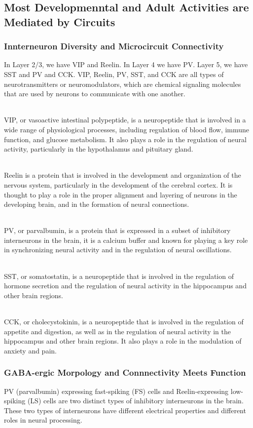 \begin{itemize}
\begin{itemize}
\section{Most Developmenntal and Adult Activities are Mediated by Circuits}
\subsubsection{Innterneuron Diversity and Microcircuit Connectivity}
In Layer 2/3, we have VIP and Reelin. In Layer 4 we have PV. Layer 5, we have SST and PV and CCK.
VIP, Reelin, PV, SST, and CCK are all types of neurotransmitters or neuromodulators, which are chemical signaling molecules that are used by neurons to communicate with one another.

\\VIP, or vasoactive intestinal polypeptide, is a neuropeptide that is involved in a wide range of physiological processes, including regulation of blood flow, immune function, and glucose metabolism. It also plays a role in the regulation of neural activity, particularly in the hypothalamus and pituitary gland.

\\Reelin is a protein that is involved in the development and organization of the nervous system, particularly in the development of the cerebral cortex. It is thought to play a role in the proper alignment and layering of neurons in the developing brain, and in the formation of neural connections.

\\PV, or parvalbumin, is a protein that is expressed in a subset of inhibitory interneurons in the brain, it is a calcium buffer and known for playing a key role in synchronizing neural activity and in the regulation of neural oscillations.

\\SST, or somatostatin, is a neuropeptide that is involved in the regulation of hormone secretion and the regulation of neural activity in the hippocampus and other brain regions.

\\CCK, or cholecystokinin, is a neuropeptide that is involved in the regulation of appetite and digestion, as well as in the regulation of neural activity in the hippocampus and other brain regions. It also plays a role in the modulation of anxiety and pain.




\subsubsection{GABA-ergic Morpology and Connnectivity Meets Function}
PV (parvalbumin) expressing fast-spiking (FS) cells and Reelin-expressing low-spiking (LS) cells are two distinct types of inhibitory interneurons in the brain. These two types of interneurons have different electrical properties and different roles in neural processing.


\end{itemize}
\end{itemize}

